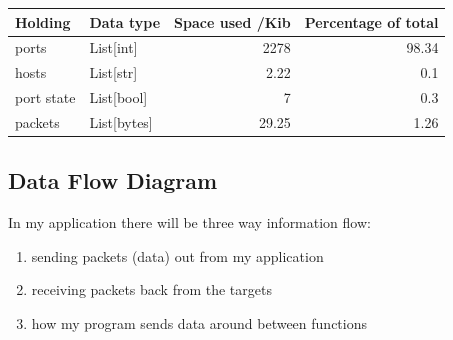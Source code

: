 \documentclass[titlepage]{article}
\let\Oldsubsection\subsection{}
\renewcommand{\subsection}{\FloatBarrier\Oldsubsection}
\begin{document}
\begin{center}
  \begin{tabular}{p{3cm} l r r}
    \toprule
    Holding    & Data type   & Space used /Kib & Percentage of total \\
    \midrule
    ports      & List[int]   & 2278            & 98.34 \\
    hosts      & List[str]   & 2.22            & 0.1   \\
    port state & List[bool]  & 7               & 0.3   \\
    packets    & List[bytes] & 29.25           & 1.26  \\
    \bottomrule
  \end{tabular}
\end{center}

\subsection{Data Flow Diagram}

In my application there will be three way information flow: 
\begin{enumerate}
  \item{sending packets (data) out from my application}
  \item{receiving packets back from the targets}
  \item{how my program sends data around between functions}
\end{enumerate}
\end{document}
